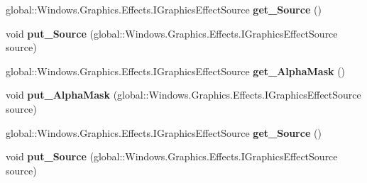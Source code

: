 \begin{DoxyCompactItemize}
\item 
\mbox{\label{interface_microsoft_1_1_graphics_1_1_canvas_1_1_effects_1_1_i_alpha_mask_effect_ac93fcaf27f7daab93dd8e361bb5e9bbf}} 
global\+::\+Windows.\+Graphics.\+Effects.\+I\+Graphics\+Effect\+Source {\bfseries get\+\_\+\+Source} ()
\item 
\mbox{\label{interface_microsoft_1_1_graphics_1_1_canvas_1_1_effects_1_1_i_alpha_mask_effect_ab4e559cfdcb7d7d7f1565fcc913c7608}} 
void {\bfseries put\+\_\+\+Source} (global\+::\+Windows.\+Graphics.\+Effects.\+I\+Graphics\+Effect\+Source source)
\item 
\mbox{\label{interface_microsoft_1_1_graphics_1_1_canvas_1_1_effects_1_1_i_alpha_mask_effect_a2ec5e6658267b1e3270f21e97ad18181}} 
global\+::\+Windows.\+Graphics.\+Effects.\+I\+Graphics\+Effect\+Source {\bfseries get\+\_\+\+Alpha\+Mask} ()
\item 
\mbox{\label{interface_microsoft_1_1_graphics_1_1_canvas_1_1_effects_1_1_i_alpha_mask_effect_a1057d37b21df4170ef6ae26c9fa68624}} 
void {\bfseries put\+\_\+\+Alpha\+Mask} (global\+::\+Windows.\+Graphics.\+Effects.\+I\+Graphics\+Effect\+Source source)
\item 
\mbox{\label{interface_microsoft_1_1_graphics_1_1_canvas_1_1_effects_1_1_i_alpha_mask_effect_ac93fcaf27f7daab93dd8e361bb5e9bbf}} 
global\+::\+Windows.\+Graphics.\+Effects.\+I\+Graphics\+Effect\+Source {\bfseries get\+\_\+\+Source} ()
\item 
\mbox{\label{interface_microsoft_1_1_graphics_1_1_canvas_1_1_effects_1_1_i_alpha_mask_effect_ab4e559cfdcb7d7d7f1565fcc913c7608}} 
void {\bfseries put\+\_\+\+Source} (global\+::\+Windows.\+Graphics.\+Effects.\+I\+Graphics\+Effect\+Source source)
\item 
\mbox{\label{interface_microsoft_1_1_graphics_1_1_canvas_1_1_effects_1_1_i_alpha_mask_effect_a2ec5e6658267b1e3270f21e97ad18181}} 

\end{DoxyCompactItemize}
